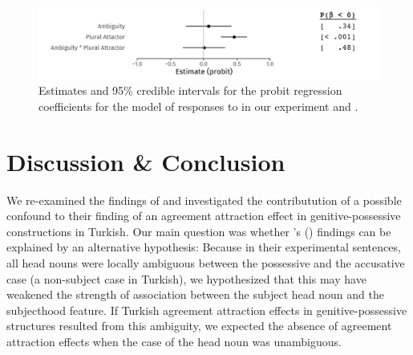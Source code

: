 \documentclass[apacite,linguex]{glossa}\usepackage[]{graphicx}\usepackage[]{color}
\makeatletter
\def\maxwidth{ %
  \ifdim\Gin@nat@width>\linewidth
    \linewidth
  \else
    \Gin@nat@width
  \fi
}
\newenvironment{knitrout}{}{} %
\makeatother
\begin{document}
\begin{figure}[hbt!]
\centering


\begin{knitrout}
\color{fgcolor}

{\centering \includegraphics[width=\maxwidth]{figure/ResponseModelUngram-1} 

}


\end{knitrout}

\caption{Estimates and 95\% credible intervals for the probit regression coefficients for the model of responses to  in our experiment and \citet{LagoEtAl:2019}.}
\label{fig:ResponseModelUngram}
\end{figure}


\section{Discussion \& Conclusion}

We re-examined the findings of \citet{LagoEtAl:2019} and investigated the contributution of a possible confound to their finding of an agreement attraction effect in genitive-possessive constructions in Turkish. Our main question was whether \citeauthor{LagoEtAl:2019}'s (\citeyear{LagoEtAl:2019}) findings can be explained by an alternative hypothesis: 
Because in their experimental sentences, all head nouns were locally ambiguous between the possessive and the accusative case (a non-subject case in Turkish), we hypothesized that this may have weakened the strength of association between the subject head noun and the subjecthood feature.
If Turkish agreement attraction effects in genitive-possessive structures resulted from this ambiguity, we expected the absence of agreement attraction effects when the case of the head noun was unambiguous.  
\end{document}
